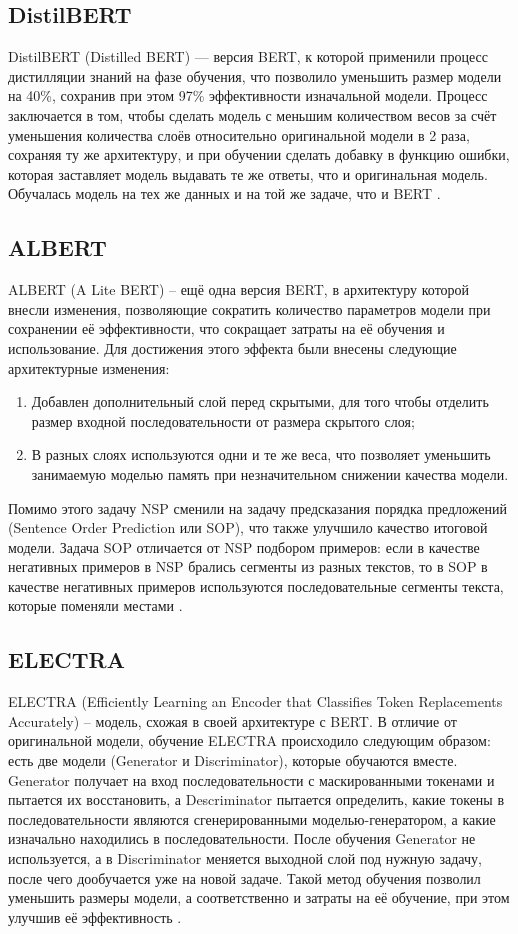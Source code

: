 \subsection{DistilBERT}
DistilBERT (Distilled BERT) — версия BERT, к которой применили процесс дистилляции знаний на фазе обучения, что позволило уменьшить размер модели на 40\%, сохранив при этом 97\% эффективности изначальной модели. Процесс заключается в том, чтобы сделать модель с меньшим количеством весов за счёт уменьшения количества слоёв относительно оригинальной модели в 2 раза, сохраняя ту же архитектуру, и при обучении сделать добавку в функцию ошибки, которая заставляет модель выдавать те же ответы, что и оригинальная модель. Обучалась модель на тех же данных и на той же задаче, что и BERT \cite{distilbert}.

\subsection{ALBERT}
ALBERT (A Lite BERT) –  ещё одна версия BERT, в архитектуру которой внесли изменения, позволяющие сократить количество параметров модели 
при сохранении её эффективности, что сокращает затраты на её обучения и использование. Для достижения этого эффекта были внесены следующие 
архитектурные изменения: 
\begin{enumerate}
    \item Добавлен дополнительный слой перед скрытыми, для того чтобы отделить размер входной последовательности от размера скрытого слоя;
    \item В разных слоях используются одни и те же веса, что позволяет уменьшить занимаемую моделью память при незначительном снижении качества модели.
\end{enumerate}
Помимо этого задачу NSP сменили на задачу предсказания порядка предложений (Sentence Order Prediction или SOP), что также улучшило качество итоговой модели. Задача SOP отличается от NSP подбором примеров: если в качестве негативных примеров в NSP брались сегменты из разных текстов, то в SOP в качестве негативных примеров используются последовательные сегменты текста, которые поменяли местами \cite{albert}.

\subsection{ELECTRA}
ELECTRA (Efficiently Learning an Encoder that Classifies Token Replacements Accurately) – модель, схожая в своей архитектуре с BERT. 
В отличие от оригинальной модели, обучение ELECTRA происходило следующим образом: есть две модели (Generator и Discriminator), которые обучаются вместе. 
Generator получает на вход последовательности с маскированными токенами и пытается их восстановить, 
а Descriminator пытается определить, какие токены в последовательности являются сгенерированными моделью-генератором, а какие изначально находились в последовательности. 
После обучения Generator не используется, а в Discriminator меняется выходной слой под нужную задачу, после чего дообучается уже на новой задаче. 
Такой метод обучения позволил уменьшить размеры модели, а соответственно и затраты на её обучение, при этом улучшив её эффективность
\cite{electra}.

